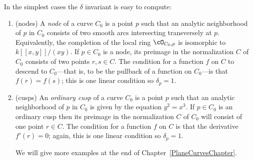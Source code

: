 In the simplest cases the $\delta$ invariant is easy to compute:


\begin{enumerate}

\item (nodes) A \emph{node} of a curve $C_0$ is a point $p$ such that an analytic neighborhood of $p$ in $C_0$ consists of two smooth arcs intersecting transversely at $p$. Equivalently, the completion of the local ring $\cO_{C_0,p}$ is isomorphic to $k[[x,y]]/(xy)$. If $p \in C_0$ is a node, its preimage in the normalization $C$ of $C_0$ consists of two points $r,s\in C$. The condition for a function $f$ on $C$ to descend to $C_0$---that is, to be the pullback of a function
on $C_0$---is  that $f(r)=f(s)$; this is one linear condition so $\delta_p = 1$.

\item (cusps) An \emph{ordinary cusp} of a curve $C_0$ is a point $p$ such that an analytic neighborhood of $p$ in $C_0$ is given by the equation $y^2=x^3$. If $p \in C_0$ is an ordinary cusp then its preimage in the normalization $C$ of $C_0$ will consist of one point $r\in C$. The condition for a function $f$ on $C$  is that the derivative $f'(r)=0$; again, this is one linear condition so $\delta_p = 1$.

We will give more examples at the end of
Chapter~\ref{PlaneCurvesChapter}.


\end{enumerate}

